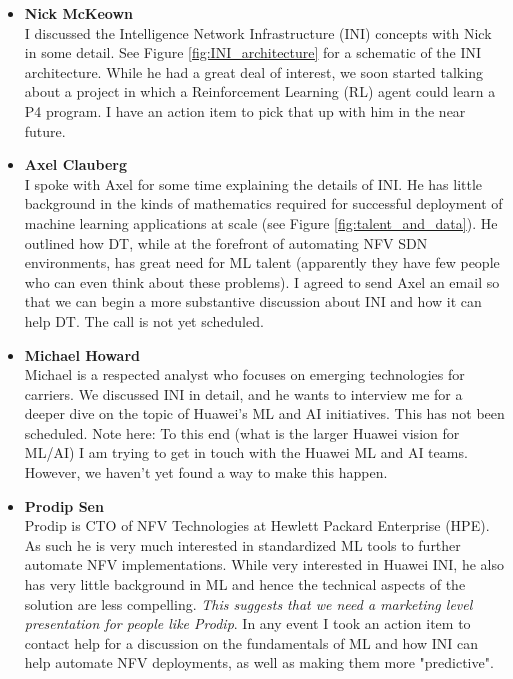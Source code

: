 \documentclass[11pt, oneside]{article}   	%
\begin{document}
\begin{itemize}
\item \textbf{Nick McKeown} \\
I discussed the Intelligence Network Infrastructure (INI) concepts with Nick in some detail. See Figure \ref{fig:INI_architecture} for a schematic of the INI architecture. While he had a great deal of interest, we soon started talking about a project in which a Reinforcement Learning (RL) agent could learn a P4 program. I have an action item to pick that up with him in the near future.

\item \textbf{Axel  Clauberg} \\
I spoke with Axel for some time explaining the details of INI. He has little background in the kinds of mathematics required for successful deployment of machine learning applications at scale (see Figure \ref{fig:talent_and_data}). He outlined how DT, while at the forefront of automating NFV SDN environments, has great need for ML talent (apparently they have few people who can even think about these problems). I agreed to send Axel an email so that we can begin a more substantive discussion about INI and how it can help DT. The call is not yet scheduled.


\item \textbf{Michael Howard} \\
Michael is a respected analyst who focuses on emerging technologies for carriers. We discussed INI in detail, and he wants to interview me for a deeper dive on the topic of Huawei's ML and AI initiatives. This has not been scheduled. Note here: To this end (what is the larger Huawei vision for ML/AI) I am trying to get in touch with the Huawei ML and AI teams. However, we haven't yet found a way to make this happen.

\item \textbf{Prodip Sen} \\
Prodip is CTO of NFV Technologies at Hewlett Packard Enterprise (HPE). As such he is very much interested in standardized ML tools to further automate NFV implementations. While very interested in Huawei INI, he also has very little background in ML and hence the technical aspects of the solution are less compelling. \emph{This suggests that we need a marketing level presentation for people like Prodip}. In any event I took an action item to contact help for a discussion on the fundamentals of ML and how INI can help automate NFV deployments, as well as making them more "predictive".


\end{itemize}
\end{document}
